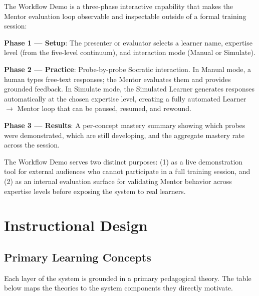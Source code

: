 \documentclass[10pt,letterpaper,twocolumn]{article}
\newcommand{\arrowto}{$\rightarrow$}
\begin{document}
The Workflow Demo is a three-phase interactive capability that makes the Mentor evaluation loop observable and inspectable outside of a formal training session:

\textbf{Phase 1 --- Setup}: The presenter or evaluator selects a learner name, expertise level (from the five-level continuum), and interaction mode (Manual or Simulate).

\textbf{Phase 2 --- Practice}: Probe-by-probe Socratic interaction. In Manual mode, a human types free-text responses; the Mentor evaluates them and provides grounded feedback. In Simulate mode, the Simulated Learner generates responses automatically at the chosen expertise level, creating a fully automated Learner \arrowto{} Mentor loop that can be paused, resumed, and rewound.

\textbf{Phase 3 --- Results}: A per-concept mastery summary showing which probes were demonstrated, which are still developing, and the aggregate mastery rate across the session.

The Workflow Demo serves two distinct purposes: (1) as a live demonstration tool for external audiences who cannot participate in a full training session, and (2) as an internal evaluation surface for validating Mentor behavior across expertise levels before exposing the system to real learners.

\section{Instructional Design}
\label{sec:instructional-design}

\subsection{Primary Learning Concepts}
\label{sec:primary-learning-concepts}

Each layer of the system is grounded in a primary pedagogical theory. The table below maps the theories to the system components they directly motivate.
\end{document}
